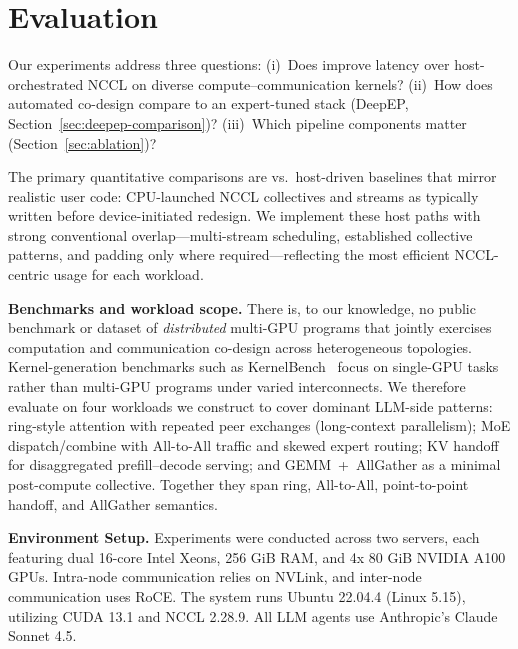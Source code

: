 \vspace{-10pt}
\section{Evaluation}
\vspace{-10pt}
Our experiments address three questions: (i)~Does \cufuse{} improve latency over host-orchestrated NCCL on diverse compute--communication kernels? (ii)~How does automated co-design compare to an expert-tuned stack (DeepEP, Section~\ref{sec:deepep-comparison})? (iii)~Which pipeline components matter (Section~\ref{sec:ablation})?

The primary quantitative comparisons are \cufuse{} vs.\ host-driven baselines that mirror realistic user code: CPU-launched NCCL collectives and streams as typically written before device-initiated redesign. We implement these host paths with strong conventional overlap---multi-stream scheduling, established collective patterns, and padding only where required---reflecting the most efficient NCCL-centric usage for each workload.


\noindent\textbf{Benchmarks and workload scope.}
There is, to our knowledge, no public benchmark or dataset of \emph{distributed} multi-GPU programs that jointly exercises computation and communication co-design across heterogeneous topologies. Kernel-generation benchmarks such as KernelBench~\cite{ouyang2025kernelbenchllmswriteefficient} focus on single-GPU tasks rather than multi-GPU programs under varied interconnects. We therefore evaluate on four workloads we construct to cover dominant LLM-side patterns: ring-style attention with repeated peer exchanges (long-context parallelism); MoE dispatch/combine with All-to-All traffic and skewed expert routing; KV handoff for disaggregated prefill--decode serving; and GEMM~+~AllGather as a minimal post-compute collective. Together they span ring, All-to-All, point-to-point handoff, and AllGather semantics.

\noindent\textbf{Environment Setup.} Experiments were conducted across two servers, each featuring dual 16-core Intel Xeons, 256 GiB RAM, and 4x 80 GiB NVIDIA A100 GPUs. Intra-node communication relies on NVLink, and inter-node communication uses RoCE. The system runs Ubuntu 22.04.4 (Linux 5.15), utilizing CUDA 13.1 and NCCL 2.28.9. All LLM agents use Anthropic's Claude Sonnet 4.5.

